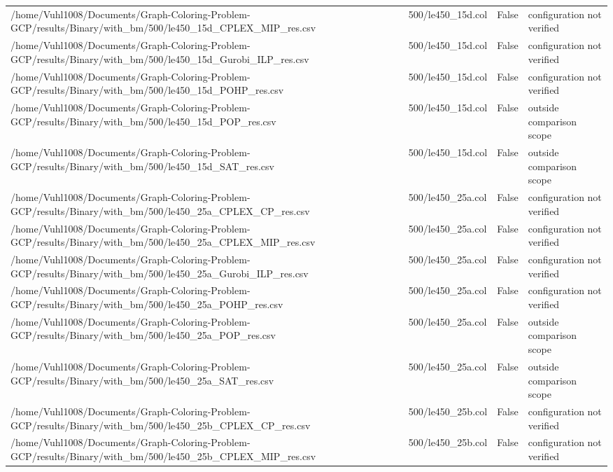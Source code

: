 \begin{table}[htbp]
\begin{tabular}{llll}
/home/Vuhl1008/Documents/Graph-Coloring-Problem-GCP/results/Binary/with\_bm/500/le450\_15d\_CPLEX\_MIP\_res.csv & 500/le450\_15d.col & False & configuration not verified \\
/home/Vuhl1008/Documents/Graph-Coloring-Problem-GCP/results/Binary/with\_bm/500/le450\_15d\_Gurobi\_ILP\_res.csv & 500/le450\_15d.col & False & configuration not verified \\
/home/Vuhl1008/Documents/Graph-Coloring-Problem-GCP/results/Binary/with\_bm/500/le450\_15d\_POHP\_res.csv & 500/le450\_15d.col & False & configuration not verified \\
/home/Vuhl1008/Documents/Graph-Coloring-Problem-GCP/results/Binary/with\_bm/500/le450\_15d\_POP\_res.csv & 500/le450\_15d.col & False & outside comparison scope \\
/home/Vuhl1008/Documents/Graph-Coloring-Problem-GCP/results/Binary/with\_bm/500/le450\_15d\_SAT\_res.csv & 500/le450\_15d.col & False & outside comparison scope \\
/home/Vuhl1008/Documents/Graph-Coloring-Problem-GCP/results/Binary/with\_bm/500/le450\_25a\_CPLEX\_CP\_res.csv & 500/le450\_25a.col & False & configuration not verified \\
/home/Vuhl1008/Documents/Graph-Coloring-Problem-GCP/results/Binary/with\_bm/500/le450\_25a\_CPLEX\_MIP\_res.csv & 500/le450\_25a.col & False & configuration not verified \\
/home/Vuhl1008/Documents/Graph-Coloring-Problem-GCP/results/Binary/with\_bm/500/le450\_25a\_Gurobi\_ILP\_res.csv & 500/le450\_25a.col & False & configuration not verified \\
/home/Vuhl1008/Documents/Graph-Coloring-Problem-GCP/results/Binary/with\_bm/500/le450\_25a\_POHP\_res.csv & 500/le450\_25a.col & False & configuration not verified \\
/home/Vuhl1008/Documents/Graph-Coloring-Problem-GCP/results/Binary/with\_bm/500/le450\_25a\_POP\_res.csv & 500/le450\_25a.col & False & outside comparison scope \\
/home/Vuhl1008/Documents/Graph-Coloring-Problem-GCP/results/Binary/with\_bm/500/le450\_25a\_SAT\_res.csv & 500/le450\_25a.col & False & outside comparison scope \\
/home/Vuhl1008/Documents/Graph-Coloring-Problem-GCP/results/Binary/with\_bm/500/le450\_25b\_CPLEX\_CP\_res.csv & 500/le450\_25b.col & False & configuration not verified \\
/home/Vuhl1008/Documents/Graph-Coloring-Problem-GCP/results/Binary/with\_bm/500/le450\_25b\_CPLEX\_MIP\_res.csv & 500/le450\_25b.col & False & configuration not verified \\

\end{tabular}
\end{table}
